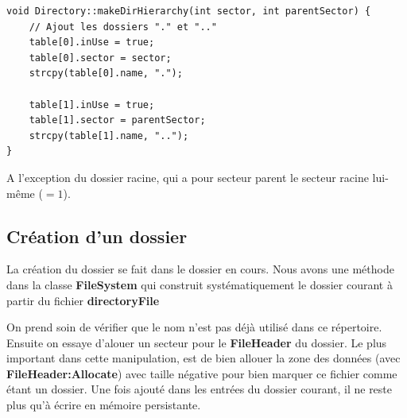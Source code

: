 \documentclass[a4paper,10pt]{article}
\begin{document}
\begin{lstlisting}
void Directory::makeDirHierarchy(int sector, int parentSector) {
    // Ajout les dossiers "." et ".."
    table[0].inUse = true;
    table[0].sector = sector;
    strcpy(table[0].name, ".");

    table[1].inUse = true;
    table[1].sector = parentSector;
    strcpy(table[1].name, "..");
}
\end{lstlisting}

A l'exception du dossier racine, qui a pour secteur parent le secteur racine
lui-même ($=1$).

\subsection{Création d'un dossier}

La création du dossier se fait dans le dossier en cours. Nous avons une méthode
dans la classe \textbf{FileSystem} qui construit systématiquement le dossier
courant à partir du fichier \textbf{directoryFile}

On prend soin de vérifier que le nom n'est pas déjà utilisé dans ce répertoire.
Ensuite on essaye d'alouer un secteur pour le \textbf{FileHeader} du dossier.
Le plus important dans cette manipulation, est de bien allouer la zone des
données (avec \textbf{FileHeader:Allocate}) avec taille négative pour bien
marquer ce fichier comme étant un dossier. Une fois ajouté dans les entrées du
dossier courant, il ne reste plus qu'à écrire en mémoire persistante.
\end{document}
